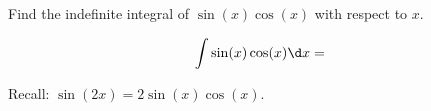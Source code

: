 \documentclass{ximera}
\author{Gregory Hartman \and Matthew Carr\and Nela Lakos}
\begin{document}
\begin{exercise}

Find the indefinite integral of $\sin(x)\cos(x)$ with respect to $x$.

\[
\int \sin(x)\cos(x)\d x=
\]
\begin{hint}
Recall: $\sin(2x)=2\sin(x)\cos(x)$.
\end{hint}
\begin{prompt}
\begin{selectAll}

\end{selectAll}

\end{prompt}

\end{exercise}
\end{document}
